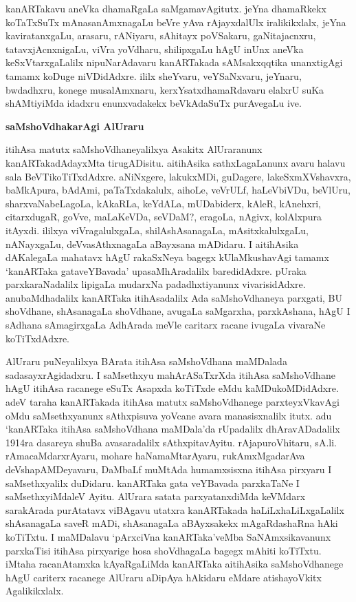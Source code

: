 \documentclass[11pt,a4size]{article}
\begin{document}
kanARTakavu aneVka dhamaRgaLa saMgamavAgitutx. jeYna dhamaRkekx
koTaTxSuTx mAnasanAmxnagaLu beVre yAva rAjayxdalUlx iralikikxlalx, jeYna
kaviratanxgaLu, arasaru, rANiyaru, sAhitayx poVSakaru, gaNitajacnxru,
tatavxjAcnxnigaLu, viVra yoVdharu, shilipxgaLu hAgU inUnx aneVka
keSxVtarxgaLalilx nipuNarAdavaru kanARTakada sAMsakxqqtika unanxtigAgi
tamamx koDuge niVDidAdxre. ililx sheYvaru, veYSaNxvaru, jeYnaru,
bwdadhxru, konege musalAmxnaru, kerxYsatxdhamaRdavaru elalxrU suKa  
shAMtiyiMda idadxru enunxvadakekx beVkAdaSuTx purAvegaLu ive.

\bigskip
\centerline{\textbf{\Large{saMshoVdhakarAgi AlUraru}}}
\medskip

itihAsa matutx saMshoVdhaneyalilxya Asakitx AlUraranunx
kanARTakadAdayxMta tirugADisitu. aitihAsika sathxLagaLanunx avaru
halavu sala BeVTikoTiTxdAdxre. aNiNxgere, lakukxMDi, guDagere,
lakeSxmXVshavxra, baMkApura, bAdAmi, paTaTxdakalulx, aihoLe, veVrULf,
haLeVbiVDu, beVlUru, sharxvaNabeLagoLa, kAkaRLa, keYdALa, mUDabiderx,
kAleR, kAnehxri, citarxdugaR, goVve, maLaKeVDa, seVDaM?, eragoLa,
nAgivx, kolAlxpura itAyxdi. ililxya viVragalulxgaLa, shilAshAsanagaLa,
mAsitxkalulxgaLu, nANayxgaLu, deVvasAthxnagaLa aBayxsana mADidaru. I
aitihAsika dAKalegaLa mahatavx hAgU rakaSxNeya bagegx kUlaMkushavAgi
tamamx `kanARTaka gataveYBavada' upasaMhAradalilx baredidAdxre. pUraka
parxkaraNadalilx lipigaLa mudarxNa padadhxtiyanunx
vivarisidAdxre. anubaMdhadalilx kanARTaka itihAsadalilx Ada
saMshoV\-dhaneya parxgati, BU shoVdhane, shAsanagaLa shoVdhane, avugaLa
saMgarxha, parxkAshana, hAgU I sAdhana sAmagirxgaLa AdhArada meVle
caritarx racane ivugaLa vivaraNe koTiTxdAdxre.

AlUraru puNeyalilxya BArata itihAsa saMshoVdhana maMDalada
sadasayxrAgidadxru. I saMsethxyu mahArASaTxrXda itihAsa saMshoVdhane
hAgU itihAsa racanege eSuTx Asapxda koTiTxde eMdu
kaMDukoMDidAdxre. adeV taraha kanARTakada itihAsa matutx
saMshoVdhanege parxteyxVkavAgi oMdu saMsethxyanunx sAthxpisuva yoVcane
avara manasisxnalilx itutx. adu `kanARTaka itihAsa saMshoVdhana
maMDala'da rUpadalilx dhAravADadalilx 1914ra dasareya shuBa
avasaradalilx sAthxpitavAyitu. rAjapuroVhitaru,
sA.li. rAmacaMdarxrAyaru, mohare haNamaMtarAyaru, rukAmxMgadarAva
deVshapAMDeyavaru, DaMbaLf muMtAda humamxsisxna itihAsa pirxyaru I
saMsethxyalilx duDidaru. kanARTaka gata veYBavada parxkaTaNe I
saMsethxyiMdaleV Ayitu. AlUrara satata parxyatanxdiMda keVMdarx
sarakArada purAtatavx viBAgavu utatxra kanARTakada
haLiLxhaLiLxgaLalilx shAsanagaLa saveR mADi, shAsanagaLa aBAyxsakekx
mAgaRdashaRna hAki koTiTxtu. I maMDalavu `pArxciVna kanARTaka'veMba
SaNAmxsikavanunx parxkaTisi itihAsa pirxyarige hosa shoVdhagaLa bagegx
mAhiti koTiTxtu. iMtaha racanAtamxka kAyaRgaLiMda kanARTaka aitihAsika
saMshoVdhanege hAgU cariterx racanege AlUraru aDipAya hAkidaru eMdare
atishayoVkitx Agalikikxlalx.
\end{document}
